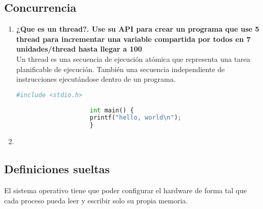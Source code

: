 \documentclass[../main.tex]{subfiles}
\begin{document}
    \subsection{Concurrencia}
        \begin{enumerate}
            \item 
                \textbf{¿Que es un thread?. Use su API para crear un programa que use 5 thread para incrementar una  variable compartida por todos en 7 unidades/thread hasta llegar a 100}\\
                Un thread es una secuencia de ejecución atómica que representa una tarea planificable de ejecución. También una secuencia independiente de instrucciones ejecutándose dentro de un programa.
                
                \begin{lstlisting}[language=Python, caption=hola mundo.]
                    #include <stdio.h>
        
                    int main() {
                    printf("hello, world\n");
                    }
                \end{lstlisting}
            \item
        \end{enumerate}

        
    \subsection*{Definiciones sueltas}
        El sistema operativo tiene que poder configurar el hardware de forma tal que cada proceso pueda leer y escribir solo su propia memoria.
\end{document}
